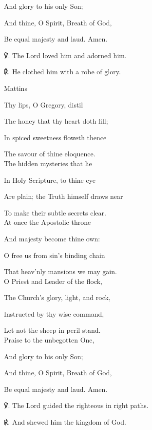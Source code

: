 \begin{paracol}{2}[]
\begin{hangparas}{1.25em}{1}
And glory to his only Son;

And thine, O Spirit, Breath of God,

Be equal majesty and laud. Amen.\\
\end{hangparas}

    ℣. The Lord loved him and adorned him.

	℟. He clothed him with a robe of glory.

\switchcolumn

\begin{inhead}
	Mattins
\end{inhead}
\begin{hangparas}{1.25em}{1}
Thy lips, O Gregory, distil

The honey that thy heart doth fill;

In spiced sweetness floweth thence

The savour of thine eloquence.\\

The hidden mysteries that lie

In Holy Scripture, to thine eye

Are plain; the Truth himself draws near

To make their subtle secrets clear.\\

At once the Apostolic throne

And majesty become thine own:

O free us from sin's binding chain

That heav'nly mansions we may gain.\\

O Priest and Leader of the flock,

The Church's glory, light, and rock,

Instructed by thy wise command,

Let not the sheep in peril stand.\\

Praise to the unbegotten One,

And glory to his only Son;

And thine, O Spirit, Breath of God,

Be equal majesty and laud. Amen.\\
\end{hangparas}

    ℣. The Lord guided the righteous in right paths.

	℟. And shewed him the kingdom of God.

\fussy
\end{paracol}

